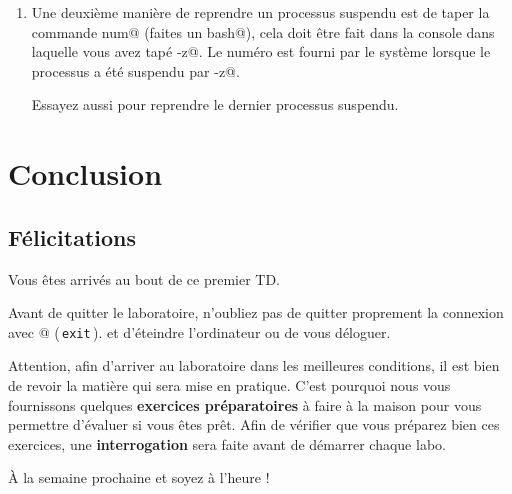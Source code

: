 \documentclass[11pt,a4paper]{article}
\begin{document}
\begin{enumerate}
			\item 
						Une deuxi\`eme mani\`ere de reprendre un processus suspendu
						est de taper la commande
						\verb@fg num@ 
						(faites un \verb@man bash@),
						cela doit \^etre fait dans la console dans laquelle vous 
						avez tap\'e \verb@Ctrl-z@.
						Le num\'ero \verb@num@
						est fourni par le syst\`eme lorsque le processus 
						a \'et\'e suspendu par \verb@Ctrl-z@.
						
            \par
        
						Essayez aussi \verb@fg@ 
						pour reprendre le dernier processus suspendu.
						
            \par
        
					\end{enumerate}
				\section{Conclusion}\subsection{F\'elicitations}
					Vous \^etes arriv\'es au bout de ce premier TD.
        				
            \par
        
					Avant de quitter le laboratoire, n'oubliez pas de 
					quitter proprement la connexion avec @
						(\,\verb|exit|\,).
					et d'\'eteindre l'ordinateur ou de vous d\'eloguer.
					
            \par
        
					Attention, afin d'arriver au laboratoire dans les meilleures conditions, il est 
					bien de revoir la mati\`ere qui sera mise en pratique.
					C'est pourquoi nous vous fournissons quelques \textbf{exercices pr\'eparatoires} \`a faire \`a la maison 
					pour vous permettre d'\'evaluer si vous \^etes pr\^et.
					Afin de v\'erifier que vous pr\'eparez bien ces exercices, une
					\textbf{interrogation}
					sera faite avant de d\'emarrer chaque labo.
				
            \par
        
					\`A la semaine prochaine et soyez \`a l'heure !
				
            \par
        
				
\end{document}
